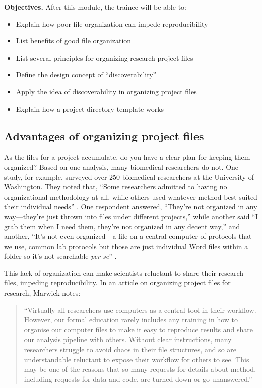 \documentclass[]{tufte-book}
\providecommand{\tightlist}{%
  \setlength{\itemsep}{0pt}\setlength{\parskip}{0pt}}
\begin{document}
\textbf{Objectives.} After this module, the trainee will be able to:

\begin{itemize}
\tightlist
\item
  Explain how poor file organization can impede reproducibility
\item
  List benefits of good file organization
\item
  List several principles for organizing research project files
\item
  Define the design concept of ``discoverability''
\item
  Apply the idea of discoverability in organizing project files
\item
  Explain how a project directory template works
\end{itemize}

\subsection{Advantages of organizing project files}\label{advantages-of-organizing-project-files}

As the files for a project accumulate, do you have a clear plan for keeping them
organized? Based on one analysis, many biomedical researchers do not. One study,
for example, surveyed over 250 biomedical researchers at the University of
Washington. They noted that, ``Some researchers admitted to having no
organizational methodology at all, while others used whatever method best suited
their individual needs'' \citep{anderson2007issues}. One respondent answered, ``They're
not organized in any way---they're just thrown into files under different
projects,'' while another said ``I grab them when I need them, they're not
organized in any decent way,'' and another, ``It's not even organized---a file on
a central computer of protocols that we use, common lab protocols but those are
just individual Word files within a folder so it's not searchable \emph{per se}''
\citep{anderson2007issues}.

This lack of organization can make scientists reluctant to share their research
files, impeding reproducibility. In an article on organizing project files for
research, Marwick notes:

\begin{quote}
``Virtually all researchers use computers as a central tool in their
workflow. However, our formal education rarely includes any training in
how to organise our computer files to make it easy to reproduce results
and share our analysis pipeline with others. Without clear instructions,
many researchers struggle to avoid chaos in their file structures, and so
are understandable reluctant to expose their workflow for others to see.
This may be one of the reasons that so many requests for details about
method, including requests for data and code, are turned down or go
unanswered.'' \citep{marwick2018packaging}
\end{quote}
\end{document}
